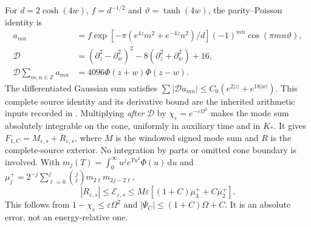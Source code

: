 \documentclass[11pt]{article}
\numberwithin{equation}{section}
\newcommand{\dd}{\,\mathrm d}
\begin{document}
For $d=2\cosh(4w)$, $f=d^{-1/2}$ and $\vartheta=\tanh(4w)$, the
parity--Poisson identity is
\begin{align*}
 a_{mn}&=f\exp[-\pi(e^{4z}m^2+e^{-4z}n^2)/d]
                         (-1)^{mn}\cos(\pi mn\vartheta),\\
 \mathcal D&=(\partial_z^2-\partial_w^2)^2
                    -8(\partial_z^2+\partial_w^2)+16,\\
 \mathcal D\sum_{m,n\in\mathbb Z}a_{mn}
       &=4096\Phi(z+w)\Phi(z-w).
\end{align*}
The differentiated Gaussian sum satisfies
$\sum|\mathcal Da_{mn}|\le C_0(e^{2|z|}+e^{18|w|})$.
This complete source identity and its derivative bound are the
inherited arithmetic inputs recorded in
\cite{FCGPoissonLocalization}. Multiplying \emph{after} $\mathcal D$
by $\chi_\varepsilon=e^{-\varepsilon\Omega^2}$ makes the mode sum
absolutely integrable on the cone, uniformly in auxiliary time and
in $K_*$. It gives $F_{1,C}=M_{\varepsilon,s}+R_{\varepsilon,s}$,
where $M$ is the windowed signed mode sum and $R$ is the complete-source
exterior. No integration by parts or omitted cone boundary is involved.
With $m_j(T)=\int_0^\infty u^je^{Tu^2}\Phi(u)\dd u$ and
$\mu_j^+=2^{-j}\sum_{\ell=0}^j\binom j\ell m_{2\ell}m_{2j-2\ell}$,
\begin{equation}\label{fcg:poissonexterior}
 |R_{\varepsilon,s}|\le\mathcal E_{\varepsilon,s}
 \le M\varepsilon[(1+C)\mu_3^++C\mu_2^+].
\end{equation}
This follows from $1-\chi_\varepsilon\le\varepsilon\Omega^2$ and
$|\Psi_C|\le(1+C)\Omega+C$. It is an absolute error, not an
energy-relative one.
\end{document}
